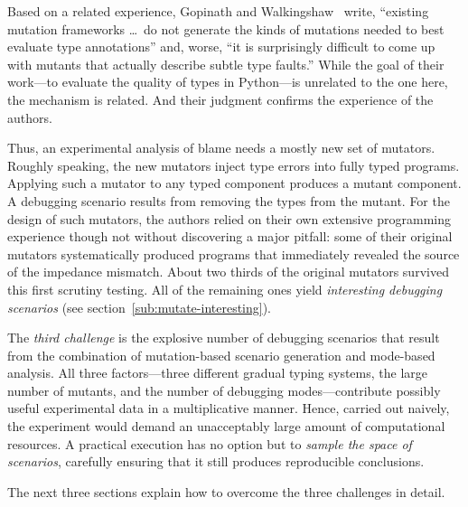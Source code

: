Based on a related experience, Gopinath and Walkingshaw~\cite{gw-mutation} write,
``existing mutation frameworks \ldots\ do not generate the kinds of mutations
needed to best evaluate type annotations'' and, worse, ``it is surprisingly
difficult to come up with mutants that actually describe subtle type faults.''
While the goal of their work---to evaluate the quality of types in
Python---is unrelated to the one here, the mechanism is related. And their
judgment confirms the experience of the authors. 

Thus, an experimental analysis of blame needs a mostly new set of mutators.
Roughly speaking, the new mutators inject type errors into fully typed programs.
Applying such a mutator to any typed component produces a mutant component.  A
debugging scenario results from removing the types from the mutant. For the
design of such mutators, the authors relied on their own extensive programming
experience though not without discovering a major pitfall: some of their
original mutators systematically produced programs that immediately revealed the
source of the impedance mismatch. About two thirds of the original mutators
survived this first scrutiny testing. All of the remaining ones yield {\em
interesting debugging scenarios\/} (see section~\ref{sub:mutate-interesting}).

The {\em third challenge\/} is the explosive number of debugging scenarios that
result from the combination of mutation-based scenario generation and mode-based
analysis. All three factors---three different gradual typing systems, the large
number of mutants, and the number of debugging modes---contribute possibly
useful experimental data in a multiplicative manner. Hence, carried out naively,
the experiment would demand an unacceptably large amount of computational
resources.  A practical execution has no option but to {\em sample the space of
scenarios\/}, carefully ensuring that it still produces reproducible
conclusions.

The next three sections explain how to overcome the three challenges
in detail. 
